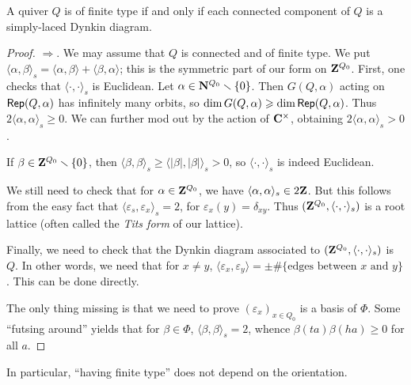 \documentclass{article}
\begin{document}
\begin{theorem}[Gabriel]
A quiver $Q$ is of finite type if and only if each connected component of $Q$ 
is a simply-laced Dynkin diagram. 
\end{theorem}
\begin{proof}
$\Rightarrow$. We may assume that $Q$ is connected and of finite type. We put 
$\langle \alpha,\beta\rangle_s = \langle \alpha,\beta\rangle + \langle \beta,\alpha\rangle$; 
this is the symmetric part of our form on $\mathbf{Z}^{Q_0}$. First, one checks that 
$\langle\cdot,\cdot\rangle_s$ is Euclidean. Let $\alpha\in \mathbf{N}^{Q_0}\smallsetminus \{0\}$. 
Then $G(Q,\alpha)$ acting on $\operatorname{\mathsf{Rep}}(Q,\alpha)$ has infinitely 
many orbits, so $\dim G(Q,\alpha) \geqslant \dim\operatorname{\mathsf{Rep}}(Q,\alpha)$. 
Thus $2\langle \alpha,\alpha\rangle_s\geqslant 0$. We can further mod out by 
the action of $\mathbf{C}^\times$, obtaining $2\langle \alpha,\alpha\rangle_s>0$. 

If $\beta\in \mathbf{Z}^{Q_0}\smallsetminus \{0\}$, then 
$\langle \beta,\beta\rangle_s\geqslant \langle |\beta|,|\beta|\rangle_s > 0$, so 
$\langle\cdot,\cdot\rangle_s$ is indeed Euclidean. 

We still need to check that for $\alpha\in \mathbf{Z}^{Q_0}$, we have 
$\langle \alpha,\alpha\rangle_s\in 2\mathbf{Z}$. But this follows from the easy 
fact that $\langle\varepsilon_s,\varepsilon_x\rangle_s = 2$, for 
$\varepsilon_x(y) = \delta_{x y}$. 
Thus $(\mathbf{Z}^{Q_0}, \langle \cdot,\cdot\rangle_s)$ is a root lattice (often 
called the \emph{Tits form} of our lattice). 

Finally, we need to check that the Dynkin diagram associated to 
$(\mathbf{Z}^{Q_0}, \langle \cdot,\cdot\rangle_s)$ is $Q$. In other words, we need 
that for $x\ne y$, 
$\langle \varepsilon_x,\varepsilon_y\rangle = \pm \#\{\text{edges between $x$ and $y$}\}$. 
This can be done directly. 

The only thing missing is that we need to prove $(\varepsilon_x)_{x\in Q_0}$ is 
a basis of $\Phi$. Some ``futsing around'' yields that for 
$\beta\in \Phi$, $\langle \beta,\beta\rangle_s = 2$, whence 
$\beta(t a) \beta(h a) \geqslant 0$ for all $a$. 
\end{proof}

In particular, ``having finite type'' does not depend on the orientation. 
\end{document}
